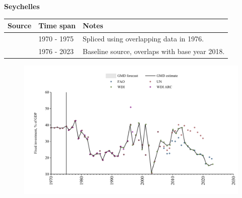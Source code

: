 \documentclass[12pt,a4paper,landscape]{article}
\begin{document}
\begin{adjustbox}{max totalsize={\paperwidth}{\paperheight},center}
\begin{minipage}[t][\textheight][t]{\textwidth}
\vspace*{0.5cm}
{}
\begin{center}
{\Large\bfseries Seychelles}
\end{center}
\vspace{0.5cm}
\begin{table}[H]
\centering
\small
\begin{tabular}{|l|l|l|}
\hline
\textbf{Source} & \textbf{Time span} & \textbf{Notes} \\
\hline
\rowcolor{white}\cite{UN}& 1970 - 1975 &Spliced using overlapping data in 1976.\\
\rowcolor{lightgray}\cite{WDI}& 1976 - 2023 &Baseline source, overlaps with base year 2018.\\
\hline
\end{tabular}
\end{table}
\begin{figure}[H]
\centering
\includegraphics[width=\textwidth,height=0.6\textheight,keepaspectratio]{graphs/SYC_finv_GDP.pdf}
\end{figure}
\end{minipage}
\end{adjustbox}
\end{document}
